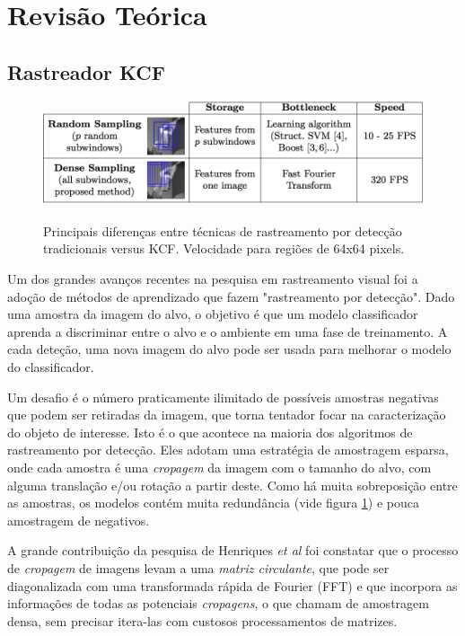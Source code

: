 \documentclass[conference]{IEEEtran}
\begin{document}
\section{Revisão Teórica}

\subsection{Rastreador KCF}
\begin{figure}[ht!]
\begin{center}
\label{kcf-table}
\includegraphics[width=\columnwidth]{tabela-henriques.png}
\caption{Principais diferenças entre técnicas de rastreamento por detecção tradicionais versus KCF. Velocidade para regiões de 64x64 pixels\cite{henriques2012}.}
\end{center}
\end{figure}
Um dos grandes avanços recentes na pesquisa em rastreamento visual foi a adoção de métodos de aprendizado que fazem "rastreamento por detecção". Dado uma amostra da imagem do alvo, o objetivo é que um modelo classificador aprenda a discriminar entre o alvo e o ambiente em uma fase de treinamento. A cada deteção, uma nova imagem do alvo pode ser usada para melhorar o modelo do classificador\cite{henriques, henriques2012}.

Um desafio é o número praticamente ilimitado de possíveis amostras negativas que podem ser retiradas da imagem, que torna tentador focar na caracterização do objeto de interesse\cite{henriques}. Isto é o que acontece na maioria dos algoritmos de rastreamento por detecção. Eles adotam uma estratégia de amostragem esparsa, onde cada amostra é uma \textit{cropagem} da imagem com o tamanho do alvo, com alguma translação e/ou rotação a partir deste\cite{henriques2012}. Como há muita sobreposição entre as amostras, os modelos contém muita redundância (vide figura \ref{kcf-table}) e pouca amostragem de negativos.

A grande contribuição da pesquisa de Henriques \textit{et al} foi constatar que o processo de \textit{cropagem} de imagens levam a uma \textit{matriz circulante}, que pode ser diagonalizada com uma transformada rápida de Fourier (FFT) e que incorpora as informações de todas as potenciais \textit{cropagens}, o que chamam de amostragem densa, sem precisar itera-las com custosos processamentos de matrizes\cite{henriques, henriques2012}.
\end{document}
